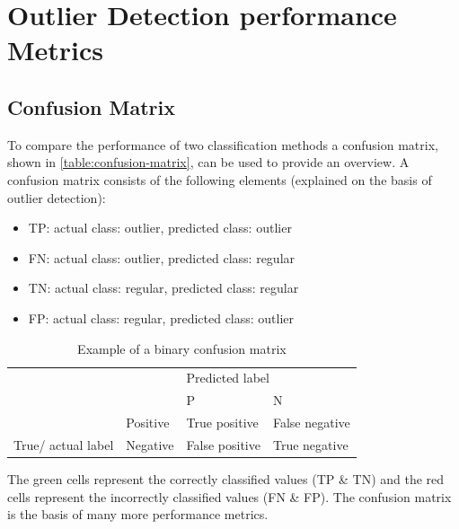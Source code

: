\section{Outlier Detection performance Metrics}
\subsection{Confusion Matrix}
To compare the performance of two classification methods a confusion matrix, shown in \autoref{table:confusion-matrix}, can be used to provide an overview. A confusion matrix consists of the following elements (explained on the basis of outlier detection):
\begin{itemize}
    \item \ac{TP}: actual class: outlier, predicted class: outlier
    \item \ac{FN}: actual class: outlier, predicted class: regular
    \item \ac{TN}: actual class: regular, predicted class: regular
    \item \ac{FP}: actual class: regular, predicted class: outlier
\end{itemize}
\begin{table}[ht]
    \begin{tabular}{llll}
     &  & \multicolumn{2}{l}{Predicted label} \\ \cline{3-4} 
     & \multicolumn{1}{l|}{} & \multicolumn{1}{l|}{\ac{P}} & \multicolumn{1}{l|}{\ac{N}} \\ \cline{2-4} 
    \multicolumn{1}{l|}{} & \multicolumn{1}{l|}{Positive} & \multicolumn{1}{l|}{\cellcolor[HTML]{9AFF99}True positive} & \multicolumn{1}{l|}{\cellcolor[HTML]{FFCCC9}False negative} \\ \cline{2-4} 
    \multicolumn{1}{l|}{\multirow{-2}{*}{True/ actual label}} & \multicolumn{1}{l|}{Negative} & \multicolumn{1}{l|}{\cellcolor[HTML]{FFCCC9}False positive} & \multicolumn{1}{l|}{\cellcolor[HTML]{9AFF99}True negative} \\ \cline{2-4} 
\end{tabular}
\caption{Example of a binary confusion matrix}
\label{table:confusion-matrix}
\end{table}
The green cells represent the correctly classified values (\ac{TP} \& \ac{TN}) and the red cells represent the incorrectly classified values (\ac{FN} \& \ac{FP}). The confusion matrix is the basis of many more performance metrics.
